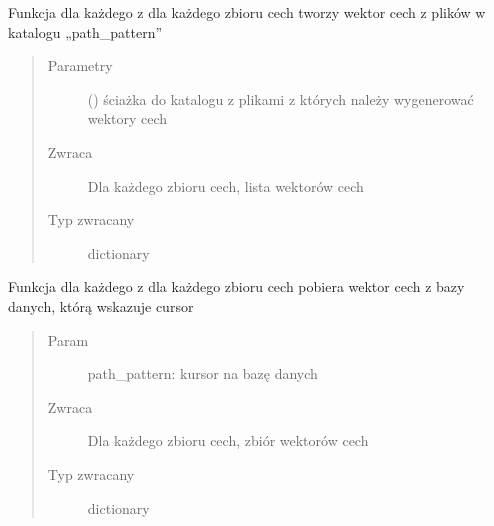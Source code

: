 \documentclass[letterpaper,10pt,polish]{sphinxmanual}
\begin{document}

\begin{fulllineitems}
\label{\detokenize{hmm_main:hmm_main.hmm_get_features_vector_from_dir}}
Funkcja dla każdego z dla każdego zbioru cech tworzy wektor cech z plików w katalogu „path\_pattern”
\begin{quote}\begin{description}
\item[{Parametry}] \leavevmode
{} () \textendash{} ściażka do katalogu z plikami z których należy wygenerować wektory cech

\item[{Zwraca}] \leavevmode
Dla każdego zbioru cech, lista wektorów cech

\item[{Typ zwracany}] \leavevmode
dictionary

\end{description}\end{quote}

\end{fulllineitems}


\begin{fulllineitems}
\label{\detokenize{hmm_main:hmm_main.hmm_get_features_vectors_from_db}}
Funkcja dla każdego z dla każdego zbioru cech pobiera wektor cech z bazy danych, którą wskazuje cursor
\begin{quote}\begin{description}
\item[{Param}] \leavevmode
path\_pattern: kursor na bazę danych

\item[{Zwraca}] \leavevmode
Dla każdego zbioru cech, zbiór wektorów cech

\item[{Typ zwracany}] \leavevmode
dictionary

\end{description}\end{quote}

\end{fulllineitems}
\end{document}
